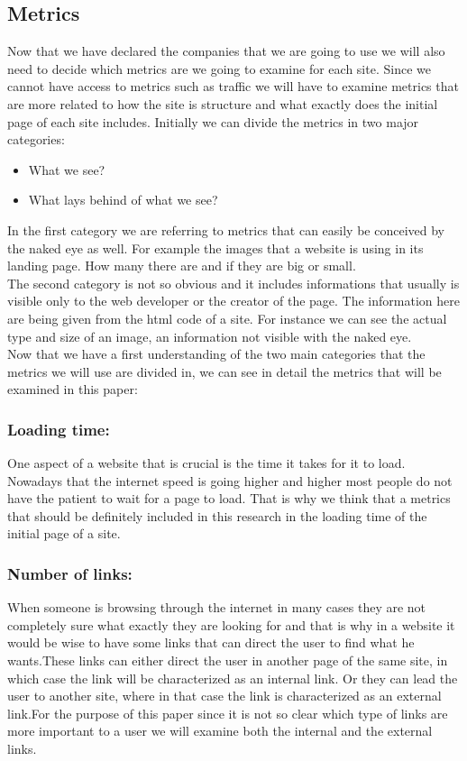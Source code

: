 \documentclass{article}
\begin{document}
\subsection{Metrics}
Now that we have declared the companies that we are going to use we will also need to decide which metrics are we going to examine for each site. Since we cannot have access to metrics such as traffic we will have to examine metrics that are more related to how the site is structure and what exactly does the initial page of each site includes. Initially we can divide the metrics in two major categories:
\begin{itemize}
\item What we see?
\item What lays behind of what we see?
\end{itemize}
In the first category we are referring to metrics that can easily be conceived by the naked eye as well. For example the images that a website is using in its landing page. How many there are and if they are big or small.\\
The second category is not so obvious and it includes informations that usually is visible only to the web developer or the creator of the page. The information here are being given from the html code of a site. For instance we can see the actual type and size of an image, an information not visible with the naked eye.\\
Now that we have a first understanding of the two main categories that the metrics we will use are divided in, we can see in detail the metrics that will be examined in this paper:
\subsubsection{Loading time:}One aspect of a website that is crucial is the time it takes for it to load. Nowadays that the internet speed is going higher and higher most people do not have the patient to wait for a page to load. That is why we think that a metrics that should be definitely included in this research in the loading time of the initial page of a site.
\subsubsection{Number of links:}When someone is browsing through the internet in many cases they are not completely sure what exactly they are looking for and that is why in a website it would be wise to have some links that can direct the user to find what he wants.These links can either direct the user in another page of the same site, in which case the link will be characterized as an internal link. Or they can lead the user to another site, where in that case the link is characterized as an external link.For the purpose of this paper since it is not so clear which type of links are more important to a user we will examine both the internal and the external links.
\end{document}
